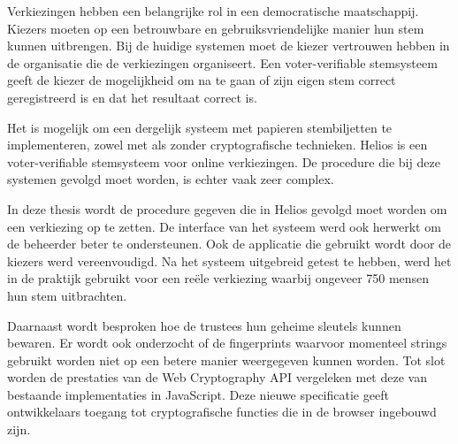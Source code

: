% 
%

Verkiezingen hebben een belangrijke rol in een democratische maatschappij. Kiezers moeten op een betrouwbare en gebruiksvriendelijke manier hun stem kunnen uitbrengen. Bij de huidige systemen moet de kiezer vertrouwen hebben in de organisatie die de verkiezingen organiseert. Een voter-verifiable stemsysteem geeft de kiezer de mogelijkheid om na te gaan of zijn eigen stem correct geregistreerd is en dat het resultaat correct is.

\npar Het is mogelijk om een dergelijk systeem met papieren stembiljetten te implementeren, zowel met als zonder cryptografische technieken. Helios is een voter-verifiable stemsysteem voor online verkiezingen. De procedure die bij deze systemen gevolgd moet worden, is echter vaak zeer complex.

\npar In deze thesis wordt de procedure gegeven die in Helios gevolgd moet worden om een verkiezing op te zetten. De interface van het systeem werd ook herwerkt om de beheerder beter te ondersteunen. Ook de applicatie die gebruikt wordt door de kiezers werd vereenvoudigd. Na het systeem uitgebreid getest te hebben, werd het in de praktijk gebruikt voor een re\"ele verkiezing waarbij ongeveer 750 mensen hun stem uitbrachten.

\npar Daarnaast wordt besproken hoe de trustees hun geheime sleutels kunnen bewaren. Er wordt ook onderzocht of de fingerprints waarvoor momenteel strings gebruikt worden niet op een betere manier weergegeven kunnen worden. Tot slot worden de prestaties van de Web Cryptography API vergeleken met deze van bestaande implementaties in JavaScript. Deze nieuwe specificatie geeft ontwikkelaars toegang tot cryptografische functies die in de browser ingebouwd zijn.